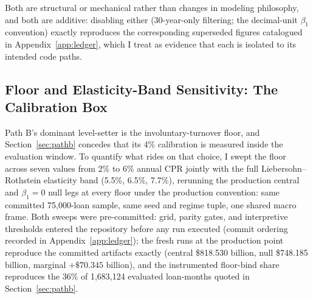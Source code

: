 \documentclass[12pt]{article}
\begin{document}
Both are structural or mechanical rather than changes in modeling philosophy, and both are additive: disabling either (30-year-only filtering; the decimal-unit $\beta_1$ convention) exactly reproduces the corresponding superseded figures catalogued in Appendix~\ref{app:ledger}, which I treat as evidence that each is isolated to its intended code paths.

\subsection{Floor and Elasticity-Band Sensitivity: The Calibration Box}\label{sec:robustness-floor}

Path B's dominant level-setter is the involuntary-turnover floor, and Section~\ref{sec:pathb} concedes that its 4\% calibration is measured inside the evaluation window. To quantify what rides on that choice, I swept the floor across seven values from 2\% to 6\% annual CPR jointly with the full Liebersohn--Rothstein elasticity band (5.5\%, 6.5\%, 7.7\%), rerunning the production central and $\beta_1 = 0$ null legs at every floor under the production convention: same committed 75,000-loan sample, same seed and regime tuple, one shared macro frame. Both sweeps were pre-committed: grid, parity gates, and interpretive thresholds entered the repository before any run executed (commit ordering recorded in Appendix~\ref{app:ledger}); the fresh runs at the production point reproduce the committed artifacts exactly (central \$818.530 billion, null \$748.185 billion, marginal $+\$70.345$ billion), and the instrumented floor-bind share reproduces the 36\% of 1,683,124 evaluated loan-months quoted in Section~\ref{sec:pathb}.
\end{document}
